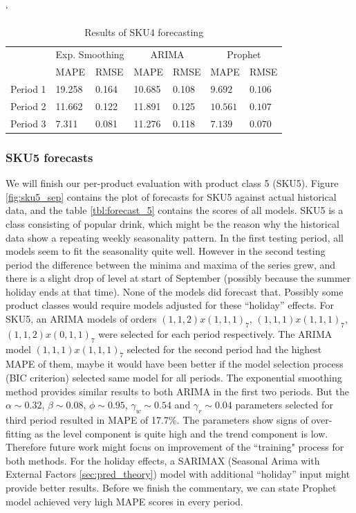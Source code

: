 \documentclass[11pt,a4paper]{article}
\begin{document}
\begin{table} \catcode`
\centering
\begin{tabular}{|l|l|l|l|l|l|l|}
\hline
\multirow{2}{*}{} & \multicolumn{2}{c|}{Exp. Smoothing} & \multicolumn{2}{c|}{ARIMA} & \multicolumn{2}{c|}{Prophet} \\ \cline{2-7} 
                  & MAPE         & RMSE        & MAPE          & RMSE          & MAPE          & RMSE         \\ \hline
Period 1  & 19.258 & 0.164 & 10.685 & 0.108 & \boldmath$9.692$\unboldmath & \boldmath$0.106$\unboldmath  \\ \hline
Period 2 & 11.662 & 0.122 & 11.891 & 0.125 & \boldmath$10.561$\unboldmath &\boldmath$ 0.107$\unboldmath \\ \hline
Period 3 & 7.311 & 0.081 & 11.276 & 0.118 & \boldmath$7.139$\unboldmath & \boldmath$0.070$\unboldmath  \\ \hline
\end{tabular}
\caption{Results of SKU4 forecasting}
\label{tbl:forecast_4}
\end{table}



\newpage
\subsubsection{SKU5 forecasts}
We will finish our per-product evaluation with product class 5 (SKU5).
Figure \ref{fig:sku5_sep} contains the plot of forecasts for SKU5  against actual historical data, and the table  \ref{tbl:forecast_5} contains the scores of all models.
 SKU5 is a class consisting of popular drink, which might be the reason why the historical data show a repeating weekly seasonality pattern. In the first testing period, all models seem to fit the seasonality quite well. However in the second testing period the difference between the minima and maxima of the series grew, and there is a slight drop of level at start of September (possibly because the summer holiday ends at that time). None of the models did forecast that. Possibly some product classes would require models adjusted for these ``holiday'' effects.
 For SKU5, an ARIMA models of orders $(1,1,2)x(1,1,1)_7$, $(1,1,1)x(1,1,1)_7$, $(1,1,2)x(0,1,1)_7$ were selected for each period respectively. The ARIMA model $(1,1,1)x(1,1,1)_7$ selected for the second period had the highest MAPE of them, maybe it would have been better if the model selection process (BIC criterion) selected same model for all periods. 
The exponential smoothing method provides similar results to both ARIMA in the first two periods. But the $\alpha\sim 0.32$,  $\beta\sim 0.08$, $\phi\sim 0.95$,  $\gamma_w \sim 0.54$ and  $\gamma_r \sim 0.04$ parameters selected for third period resulted in MAPE of 17.7\%. The parameters show signs of over-fitting as the level component is quite high and the trend component is low. Therefore future work might focus on improvement of the ``training" process for both methods. For the holiday effects, a SARIMAX (Seasonal Arima with External Factors \ref{sec:pred_theory}) model with additional ``holiday'' input might provide better results.
Before we finish the commentary, we can state Prophet model achieved very high MAPE scores in every period.
\end{document}
